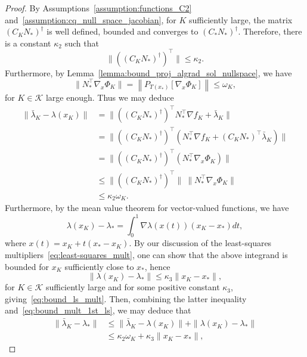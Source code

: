 \documentclass[pdflatex,sn-mathphys-num]{sn-jnl}%
\theoremstyle{thmstyleone}%
\newcommand{\calK}{{\mathcal{K}}}
\newcommand{\proj}[2]{P_{#1} \left[ {#2} \right]} %
\begin{document}
\begin{proof}
	By Assumptions~\ref{assumption:functions_C2} and~\ref{assumption:cq_null_space_jacobian}, for $K$ sufficiently large, the matrix $\left(C_KN_*\right)^\dagger$ is well defined, bounded and converges to $\left(C_*N_*\right)^\dagger$. Therefore, there is a constant $\kappa_2$ such that
	\begin{equation*}
		\|(\left(C_KN_*\right)^\dagger)^\top \| \le \kappa_2.
	\end{equation*}
	Furthermore, by Lemma~\ref{lemma:bound_proj_algrad_sol_nullspace}, we have
	\[ \|N_*^\top \nabla_x\Phi_K\| = \left\| \proj{T(x_*)}{\nabla_x \Phi_K} \right\| \le  \omega_K,\]
	for $K \in \calK$ large enough. Thus we may deduce
	\begin{equation}\label{eq:bound_mult_1st_ls}
		\begin{split}
			\|\bar \lambda_K - \lambda(x_K) \| & = \|(\left(C_KN_*\right)^\dagger)^\top N_*^\top\nabla f_K + \bar\lambda_K\| \\
			& = \|(\left(C_KN_*\right)^\dagger)^\top (N_*^\top\nabla f_K + (C_KN_*)^\top\bar\lambda_K)\| \\
			& = \|((C_KN_*)^\dagger)^\top (N_*^\top  \nabla_x \Phi_K)\| \\
			& \le 	\|(\left(C_KN_*\right)^\dagger)^\top \| \ \|N_*^\top \nabla_x\Phi_K\| \\
			& \le \kappa_2 \omega_K.
		\end{split}
	\end{equation}
	Furthermore, by the mean value theorem for vector-valued functions, we have
	\[\lambda(x_K) - \lambda_* = \int_{0}^{1} \nabla \lambda(x(t))(x_K-x_*)dt,\]
	where $x(t) = x_K + t(x_*-x_K)$. By our discussion of the least-squares multipliers~\eqref{eq:least-squares_mult}, one can show that the above integrand is bounded for $x_K$ sufficiently close to $x_*$, hence
	\[\| \lambda(x_K) - \lambda_*\| \le \kappa_3 \|x_K-x_*\|,\]
	for $K\in \calK$ sufficiently large and for some positive constant $\kappa_3$, giving~\eqref{eq:bound_ls_mult}.
	Then, combining the latter inequality and~\eqref{eq:bound_mult_1st_ls}, we may deduce that
	\begin{equation*}
		\begin{split}
			\|\bar \lambda_K - \lambda_* \| & \le \|\bar \lambda_K - \lambda(x_K) \| + \|\lambda(x_K) - \lambda_* \| \\
			& \le \kappa_2 \omega_K + \kappa_3 \|x_K-x_*\|,
		\end{split}
	\end{equation*}

\end{proof}
\end{document}
